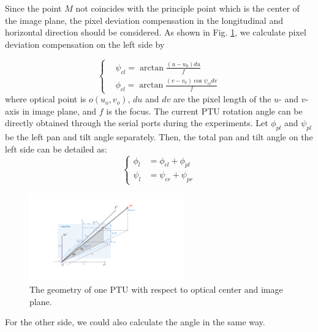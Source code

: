 Since the point ${M}$ not coincides with the principle point which is the center of the image plane, the pixel deviation compensation in the longitudinal and horizontal direction should be considered. As shown in Fig. \ref{fig:Fig02_ImagePlaneOnly}, we calculate pixel deviation compensation on the left side by 

\begin{equation} 
	\left \{
	\begin{split}
		& \psi_{cl} = \arctan \frac{(u-u_0)du}{f} \\
		& \phi_{cl} = \arctan \frac{(v-v_0)\cos\psi_{cl}dv}{f} 
	\end{split}
	\right.
\end{equation}
where optical point is $o(u_o,v_o)$, $du$ and $dv$ are the pixel length of the $u$- and $v$-axis in image plane, and $f$ is the focus. The current PTU rotation angle can be directly obtained through the serial ports during the experiments. Let $\phi_{pl}$ and $\psi_{pl}$ be the left pan and tilt angle separately. Then, the total pan and tilt angle on the left side can be detailed as:
\begin{equation} 
	\left \{
	\begin{split}
		\phi_l &= \phi_{cl} + \phi_{pl} \\ 
		\psi_l &= \psi_{cr} + \psi_{pr}
	\end{split}
	\right.
\end{equation}

\begin{figure}[!th]
	\centering
	\includegraphics[width=0.6\textwidth]{Figs/chp03_vision_02_image_plane.pdf}
	\caption{The geometry of one PTU with respect to optical center and image plane.}
	\label{fig:Fig02_ImagePlaneOnly}
\end{figure}

For the other side, we could also calculate the angle in the same way. 


